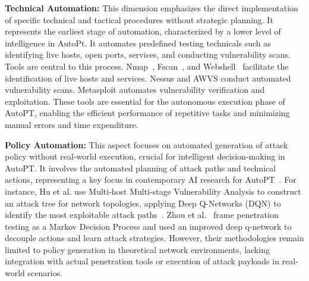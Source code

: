 

\textbf{Technical Automation:} This dimension emphasizes the direct implementation of specific technical and tactical procedures without strategic planning. It represents the earliest stage of automation, characterized by a lower level of intelligence in AutoPt.
It automates predefined testing technicals such as identifying live hosts, open ports, services, and conducting vulnerability scans. Tools are central to this process. Nmap~\cite{lyon2009nmap}, Fscan~\cite{Fscan}, and Webshell~\cite{longxiao2018webshell} facilitate the identification of live hosts and services. Nessus and AWVS conduct automated vulnerability scans. Metasploit automates vulnerability verification and exploitation. These tools are essential for the autonomous execution phase of AutoPT, enabling the efficient performance of repetitive tasks and minimizing manual errors and time expenditure. 


\textbf{Policy Automation:} This aspect focuses on automated generation of attack policy without real-world execution, crucial for intelligent decision-making in AutoPT. It involves the automated planning of attack paths and technical actions, representing a key focus in contemporary AI research for AutoPT~\cite{enoch2020harmer,schwartz2020pomdp+,becker2024evaluation}. For instance, Hu et al. use Multi-host Multi-stage Vulnerability Analysis to construct an attack tree for network topologies, applying Deep Q-Networks (DQN) to identify the most exploitable attack paths~\cite{hu2020automated}. Zhou et al.~\cite{zhou2021autonomous} frame penetration testing as a Markov Decision Process and used an improved deep q-network to decouple actions and learn attack strategies. However, their methodologies remain limited to policy generation in theoretical network environments, lacking integration with actual penetration tools or execution of attack payloads in real-world scenarios.


